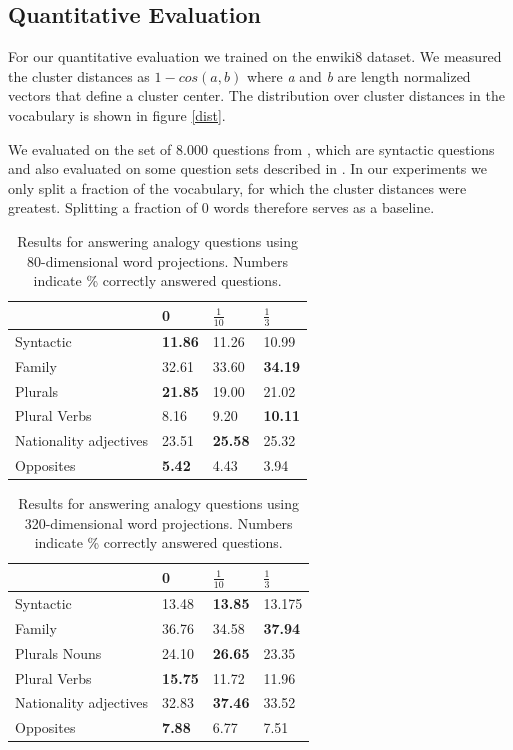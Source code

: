 \documentclass[11pt]{article}
\begin{document}
\subsection{Quantitative Evaluation}
\label{qual}
For our quantitative evaluation we trained on the enwiki8 dataset. We measured the cluster distances as $1-cos(a,b)$ where \textit{a} and \textit{b} are length normalized vectors that define a cluster center. The distribution over cluster distances in the vocabulary is shown in figure \ref{dist}.

We evaluated on the set of $8.000$ questions from \cite{Mikolov:13}, which are syntactic questions and also evaluated on some question sets described in \cite{Mikolov:13c}. In our experiments we only split a fraction of the vocabulary, for which the cluster distances were greatest. Splitting a fraction of $0$ words therefore serves as a baseline.
\begin{table}[H]
    \begin{tabular}{|l|l|l|l|}
    \hline
	\backslashbox{Questions}{Split} & 0 & $\frac{1}{10}$ & $\frac{1}{3}$  \\ \hline
	Syntactic  & \textbf{11.86}  & 11.26  & 10.99      \\ \hline
	Family  & 32.61  & 33.60 & \textbf{34.19}     \\ \hline
	Plurals  & \textbf{21.85}  & 19.00 & 21.02     \\ \hline
	Plural Verbs  & 8.16 & 9.20 & \textbf{10.11}     \\ \hline
	Nationality adjectives  & 23.51 & \textbf{25.58} & 25.32     \\ \hline
	Opposites  & \textbf{5.42} & 4.43 & 3.94    \\ \hline

    \end{tabular}
     \caption{Results for answering analogy questions using 80-dimensional word projections. Numbers indicate \% correctly answered questions.}
    \label{accuracy80}
\end{table}

\begin{table}[H]
    \begin{tabular}{|l|l|l|l|}
    \hline
	\backslashbox{Questions}{Split} & 0 & $\frac{1}{10}$ & $\frac{1}{3}$  \\ \hline
	Syntactic  & 13.48  & \textbf{13.85}  & 13.175      \\ \hline
	Family  & 36.76  & 34.58 & \textbf{37.94}     \\ \hline
	Plurals Nouns & 24.10  & \textbf{26.65} & 23.35     \\ \hline
	Plural Verbs  & \textbf{15.75} & 11.72 & 11.96     \\ \hline
	Nationality adjectives  & 32.83 & \textbf{37.46} & 33.52     \\ \hline
	Opposites  & \textbf{7.88} & 6.77 & 7.51    \\ \hline

    \end{tabular}
     \caption{Results for answering analogy questions using 320-dimensional word projections. Numbers indicate \% correctly answered questions.}
    \label{accuracy320}
\end{table}
\end{document}
